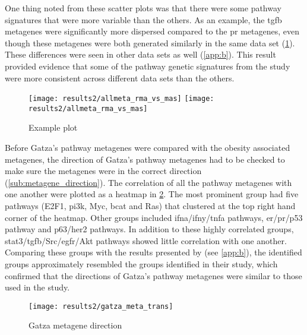 One thing noted from these scatter plots was that there were some pathway signatures that were more variable than the others.
As an example, the \gls{tgfb} metagenes were significantly more dispersed compared to the \gls{pr} metagenes, even though these metagenes were both generated similarly in the same data set (\cref{fig:gt_rma_vs_mas}).
These differences were seen in other data sets as well (\cref{app:b}).
This result provided evidence that some of the pathway genetic signatures from the \citet{Gatza2010a} study were more consistent across different data sets than the others.
\\

\begin{figure}[htpb]
	\centering
	\texttt{[image: results2/allmeta\_rma\_vs\_mas]}
	\texttt{[image: results2/allmeta\_rma\_vs\_mas]}
	\caption{Example plot}
	\label{fig:gt_rma_vs_mas}
\end{figure}

\noindent
Before Gatza's pathway metagenes were compared with the obesity associated metagenes, the direction of Gatza's pathway metagenes had to be checked to make sure the metagenes were in the correct direction (\cref{sub:metagene_direction}).
The correlation of all the pathway metagenes with one another were plotted as a heatmap in \cref{fig:gatza_meta_dir}.
The most prominent group had five pathways (E2F1, \gls{pi3k}, Myc, \gls{bcat} and Ras) that clustered at the top right hand corner of the heatmap.
Other groups included \gls{ifna}/\gls{ifny}/\gls{tnfa} pathways, \gls{er}/\gls{pr}/p53 pathway and p63/\gls{her2} pathways.
In addition to these highly correlated groups, \gls{stat3}/\gls{tgfb}/Src/\gls{egfr}/Akt pathways showed little correlation with one another.
Comparing these groups with the results presented by \citet{Gatza2010a} (see \cref{app:b}), the identified groups approximately resembled the groups identified in their study, which confirmed that the directions of Gatza's pathway metagenes were similar to those used in the \citet{Gatza2010a} study.

\begin{figure}[htpb]
	\centering
	\texttt{[image: results2/gatza\_meta\_trans]}
	\caption{Gatza metagene direction}
	\label{fig:gatza_meta_dir}
\end{figure}

